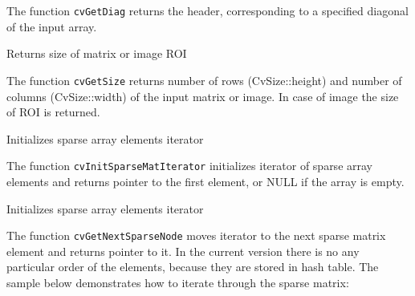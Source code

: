 The function \texttt{cvGetDiag} returns the header, corresponding to a specified diagonal of the input array.


Returns size of matrix or image ROI


\begin{description}
\end{description}

The function \texttt{cvGetSize} returns number of rows (CvSize::height) and number of columns (CvSize::width) of the input matrix or image. In case of image the size of ROI is returned.



Initializes sparse array elements iterator


\begin{description}
\end{description}

The function \texttt{cvInitSparseMatIterator} initializes iterator of
sparse array elements and returns pointer to the first element, or NULL
if the array is empty.


Initializes sparse array elements iterator


\begin{description}
\end{description}


The function \texttt{cvGetNextSparseNode} moves iterator to the next sparse matrix element and returns pointer to it. In the current version there is no any particular order of the elements, because they are stored in hash table. The sample below demonstrates how to iterate through the sparse matrix:

